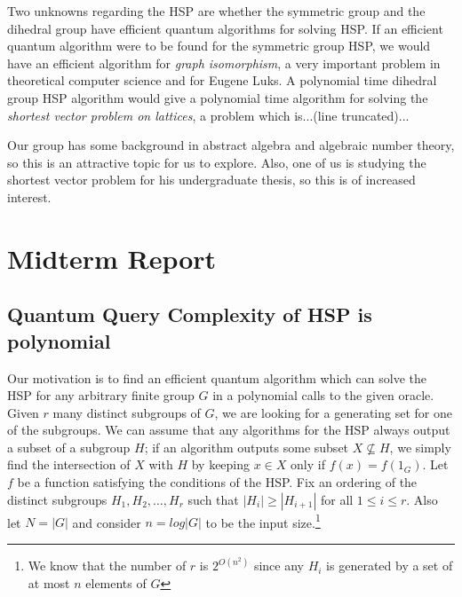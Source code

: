 \documentclass[dvips,12pt]{article}
\theoremstyle{plain}
\theoremstyle{definition}
\begin{document}
Two unknowns regarding the HSP are whether the symmetric group and the dihedral group have efficient quantum algorithms for solving HSP. If an efficient quantum algorithm were to be found for the symmetric group HSP, we would have an efficient algorithm for \emph{graph isomorphism}, a very important problem in theoretical computer science and for Eugene Luks. A polynomial time dihedral group HSP algorithm would give a polynomial time algorithm for solving the \emph{shortest vector problem on lattices}, a problem which is...(line truncated)...

Our group has some background in abstract algebra and algebraic number theory, so this is an attractive topic for us to explore. Also, one of us is studying the shortest vector problem for his undergraduate thesis, so this is of increased interest.\\
%

%
\section{Midterm Report}


\subsection{Quantum Query Complexity of HSP is polynomial}
Our motivation is to find an efficient quantum algorithm which can solve the HSP for any arbitrary finite group $G$ in a polynomial calls to the given oracle. Given $r$ many distinct subgroups of $G$, we are looking for a generating set for one of the subgroups. We can assume that any algorithms for the HSP always output a subset of a subgroup $H$; if an algorithm outputs some subset $X\nsubseteq H$, we simply find the intersection of $X$ with $H$ by keeping $x\in X$ only if $f(x)=f(1_G)$.
\newline
Let $f$ be a function satisfying the conditions of the HSP. Fix an ordering of the distinct subgroups $H_1,H_2,\ldots,H_r$ such that $|H_{i}|\geq|H_{i+1}|$ for all $1\leq i \leq r$. Also let $N=|G|$ and consider $n=log|G|$ to be the input size.\footnote{We know that the number of $r$ is $2^{O(n^2)}$ since any $H_i$ is generated by a set of at most $n$ elements of $G$}
\newline
\end{document}
